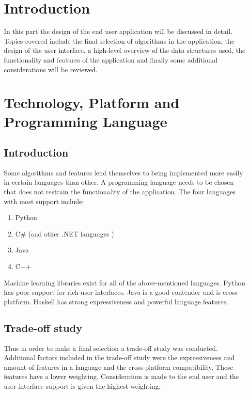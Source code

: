 

\chapter{Introduction}
In this part the design of the end user application will be discussed in detail. Topics covered include the final selection of algorithms in the application, the design of the user interface, a high-level overview of the data structures used, the functionality and features of the application and finally some additional considerations will be reviewed.

\chapter{Technology, Platform and Programming Language}
\section{Introduction}
Some algorithms and features lend themselves to being implemented more easily in certain languages than other. A programming language needs to be chosen that does not restrain the functionality of the application. 
The four languages with most support include:
\begin{enumerate}
\item Python
\item C\# (and other .NET languages
)\item Java
\item C++
\end{enumerate}

Machine learning libraries exist for all of the above-mentioned languages. Python has poor support for rich user interfaces. Java is a good contender and is cross-platform. Haskell has strong expressiveness and powerful language features.

\section{Trade-off study}

Thus in order to make a final selection a trade-off study was conducted. Additional factors included in the trade-off study were the expressiveness and amount of features in a language and the cross-platform compatibility. These features have a lower weighting.
Consideration is made to the end user and the user interface support is given the highest weighting.  

